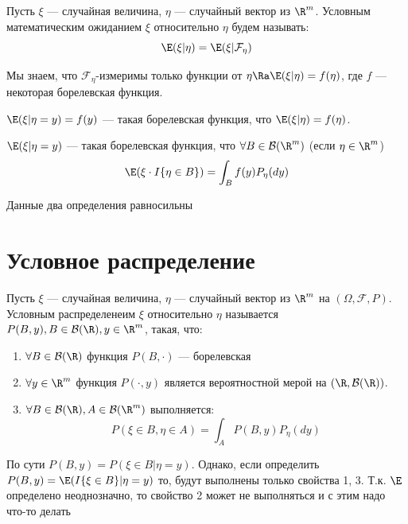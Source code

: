 \begin{definition}
    Пусть \(\xi\) --- случайная величина, \(\eta\) --- случайный вектор из \(\R^m\). Условным математическим ожиданием \(\xi\) относительно \(\eta\) будем называть:
    \[\E(\xi|\eta) = \E(\xi|\mathcal{F}_{\eta})\]
\end{definition}

\begin{note}
    Мы знаем, что \(\mathcal{F}_\eta\)-измеримы только функции от \(\eta \Ra \E(\xi|\eta) = f(\eta)\), где \(f\) --- некоторая борелевская функция.
\end{note}

\begin{definition}
    \(\E(\xi|\eta = y) = f(y)\) --- такая борелевская функция, что \(\E(\xi|\eta) = f(\eta)\).
\end{definition}

\begin{definition}
    \(\E(\xi|\eta = y)\) --- такая борелевская функция, что \(\forall B \in \mathcal{B}(\R^m)\) (если \(\eta \in \R^m\))
    \[\E(\xi \cdot I\{\eta \in B\}) = \int_B f(y)P_\eta(dy)\]
\end{definition}

Данные два определения равносильны

\section{Условное распределение}
\begin{definition}
    Пусть \(\xi\) --- случайная величина, \(\eta\) --- случайный вектор из \(\R^m\) на \((\Omega, \mathcal{F}, P)\). Условным распределенеим \(\xi\) относительно \(\eta\) называется \(P(B, y), B \in \mathcal{B}(\R), y \in \R^m\), такая, что:
    \begin{enumerate}
        \item \(\forall B \in \mathcal{B}(\R)\) функция \(P(B, \cdot)\) --- борелевская
        \item \(\forall y \in \R^m \) функция \(P(\cdot, y)\) является вероятностной мерой на \((\R, \mathcal{B}(\R))\).
        \item \(\forall B \in \mathcal{B}(\R), A \in \mathcal{B}(\R^m)\) выполняется:
        \[P(\xi \in B, \eta \in A) = \int_AP(B, y)P_\eta(dy)\]
    \end{enumerate}
\end{definition}

\begin{note}
    По сути \(P(B, y) = P(\xi \in B | \eta = y)\). Однако, если определить \(P(B, y) = \E(I\{\xi \in B\} | \eta = y)\) то, будут выполнены только свойства 1, 3. Т.к. \(\E\) определено неоднозначно, то свойство 2 может не выполняться и с этим надо что-то делать
\end{note}

